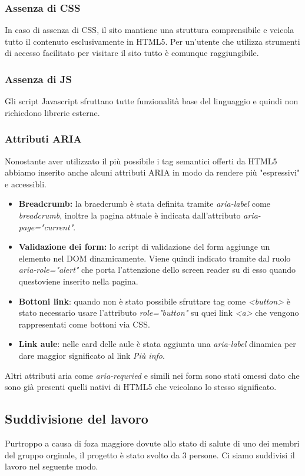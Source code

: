 \subsubsection{Assenza di CSS}
In caso di assenza di CSS, il sito mantiene una struttura comprensibile e veicola tutto il contenuto esclusivamente in HTML5. Per un'utente che utilizza strumenti di accesso facilitato per visitare il sito tutto è comunque raggiungibile.

\subsubsection{Assenza di JS}
Gli script Javascript sfruttano tutte funzionalità base del linguaggio e quindi non richiedono librerie esterne.

\subsubsection{Attributi ARIA}
Nonostante aver utilizzato il più possibile i tag semantici offerti da HTML5 abbiamo inserito anche alcuni attributi ARIA in modo da rendere più "espressivi" e accessibli.
\begin{itemize}
    \item \textbf{Breadcrumb:} la braedcrumb è stata definita tramite \textit{aria-label} come \textit{breadcrumb}, inoltre la pagina attuale è indicata dall'attributo \textit{aria-page="current"}.
    \item \textbf{Validazione dei form:} lo script di validazione del form aggiunge un elemento nel DOM dinamicamente. Viene quindi indicato tramite dal ruolo \textit{aria-role="alert"} che porta l'attenzione dello screen reader su di esso quando questoviene inserito nella pagina.
    \item \textbf{Bottoni link}: quando non è stato possibile sfruttare tag come \textit{<button>} è stato necessario usare l'attributo \textit{role="button"} su quei link \textit{<a>} che vengono rappresentati come bottoni via CSS.
    \item \textbf{Link aule}: nelle card delle aule è stata aggiunta una \textit{aria-label} dinamica per dare maggior significato al link \textit{Più info}.
\end{itemize}
Altri attributi aria come \textit{aria-requried} e simili nei form sono stati omessi dato che sono già presenti quelli nativi di HTML5 che veicolano lo stesso significato.

\subsection{Suddivisione del lavoro}
Purtroppo a causa di foza maggiore dovute allo stato di salute di uno dei membri del gruppo orginale, il progetto è stato svolto da 3 persone. Ci siamo suddivisi il lavoro nel seguente modo.

